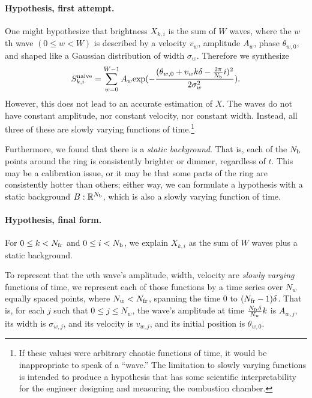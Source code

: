 \documentclass{article}
\begin{document}
\paragraph{Hypothesis, first attempt.}
One might hypothesize that brightness $X_{k,i}$ is the sum of $W$ waves,
where the $w$th wave $(0\le w <W)$ is described by a velocity $v_w$, amplitude $A_w$, phase $\theta_{w,0}$,
and shaped like a Gaussian distribution of width $\sigma_w$.  Therefore we synthesize
\begin{equation}\label{Snaive}
S^\mathrm{naive}_{k,i} = \sum_{w=0}^{W-1} A_w \mathrm{exp}(- \frac{(\theta_{w,0} + v_w k \delta -
  \frac{2\pi}{{N_\mathrm{b}}}i)^2}{2 \sigma_w^2}).
\end{equation}
However, this does not lead to an accurate estimation of $X$.  The waves do not have
constant amplitude, nor constant velocity, nor constant width.  Instead, all three of these
are slowly varying functions of time.\footnote{If these values were arbitrary chaotic functions of time,
it would be inappropriate to speak of a ``wave.''  The limitation to slowly varying functions is
intended to produce a hypothesis that has some scientific interpretability for the
engineer designing and measuring the combustion chamber.}

Furthermore, we found that there is a \emph{static background}.  That is, each of the ${N_\mathrm{b}}$ points around
the ring is consistently brighter or dimmer, regardless of $t$.  This may be a calibration issue, or
it may be that some parts of the ring are consistently hotter than others; either way, we can formulate
a hypothesis with a static background $B: \mathbb{R}^{{N_\mathrm{b}}}$, which is also a slowly varying function of time.

\paragraph{Hypothesis, final form.}
For $0 \le k < {N_\mathrm{fr}}$ and $0 \le i < {N_\mathrm{b}}$,
we explain $X_{k,i}$ as the sum of $W$ waves plus a static background.

To represent that the $w$th wave's amplitude, width, velocity are \emph{slowly varying} functions of time,
we represent each of those functions by a time series over $N_w$ equally spaced points, where $N_w < {N_\mathrm{fr}}$,
spanning the time $0$ to $({N_\mathrm{fr}}-1)\delta$.
That is, for each $j$ such that $0 \le j \le N_w$,
the wave's amplitude at time  $\frac{{N_\mathrm{fr}} \delta}{N_w}k$ is
$A_{w,j}$, its width is $\sigma_{w,j}$,
and its velocity is $v_{w,j}$, and its initial position is $\theta_{w,0}$.
\end{document}
